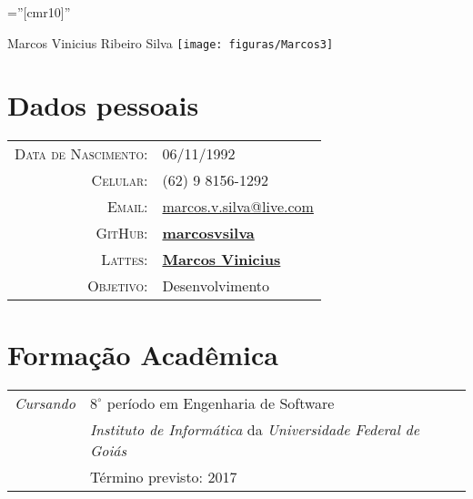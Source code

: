 \documentclass[a4paper,10pt]{article}
\begin{document}
\pagestyle{empty} 

\font\fb=''[cmr10]'' 


\par{
	\raggedright{\Huge Marcos Vinicius Ribeiro Silva}
	\bigskip
	\raggedleft\texttt{[image: figuras/Marcos3]}
\par}

\section{Dados pessoais}

\begin{tabular}{rl}
	\textsc{Data de Nascimento:} & 06/11/1992\\
	\textsc{Celular:} & (62) 9 8156-1292\\
	\textsc{Email:} & \href{mailto:marcos.v.silva@live.com}{marcos.v.silva@live.com} \\
	\textsc{GitHub:\/\/} & \href{https://github.com/marcosvsilva}{\bf marcosvsilva} \\
	\textsc{Lattes:\/\/} & \href{ http://lattes.cnpq.br/6930019751033452}{\bf Marcos Vinicius} \\
	\textsc{Objetivo:} & Desenvolvimento \\
\end{tabular}


\section{Formação Acadêmica}

\begin{tabular}{r|p{11cm}}
\emph{Cursando} & $8^{\circ}$ período em Engenharia de Software \\
& \emph{Instituto de Informática} da \emph{Universidade Federal de Goiás} \\
& Término previsto: 2017\\
\end{tabular}
\end{document}
